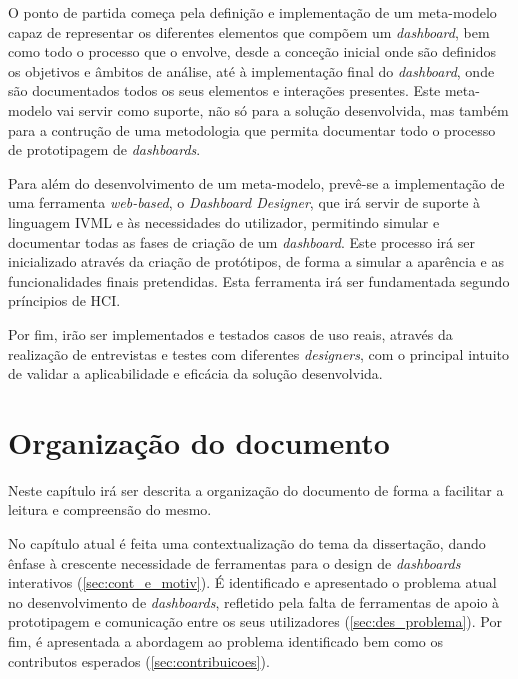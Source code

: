O ponto de partida começa pela definição e implementação de um meta-modelo capaz de representar os diferentes elementos que compõem um \textit{dashboard}, bem como todo o processo que o envolve, desde a conceção inicial onde são definidos os objetivos e âmbitos de análise, até à implementação final do \textit{dashboard}, onde são documentados todos os seus elementos e interações presentes. Este meta-modelo vai servir como suporte, não só para a solução desenvolvida, mas também para a contrução de uma metodologia que permita documentar todo o processo de prototipagem de \textit{dashboards}.

Para além do desenvolvimento de um meta-modelo, prevê-se a implementação de uma ferramenta \textit{web-based}, o \textit{Dashboard Designer}, que irá servir de suporte à linguagem \gls{IVML} e às necessidades do utilizador, permitindo simular e documentar todas as fases de criação de um \textit{dashboard}. Este processo irá ser inicializado através da criação de protótipos, de forma a simular a aparência e as funcionalidades finais pretendidas. Esta ferramenta irá ser fundamentada segundo príncipios de \gls{HCI}.

Por fim, irão ser implementados e testados casos de uso reais, através da realização de entrevistas e testes com diferentes \textit{designers}, com o principal intuito de validar a aplicabilidade e eficácia da solução desenvolvida. 

\section{Organização do documento}
\label{sec:organizacao}

Neste capítulo irá ser descrita a organização do documento de forma a facilitar a leitura e compreensão do mesmo. 

No capítulo atual é feita uma contextualização do tema da dissertação, dando ênfase à crescente necessidade de ferramentas para o design de \textit{dashboards} interativos (\ref{sec:cont_e_motiv}). É identificado e apresentado o problema atual no desenvolvimento de \textit{dashboards}, refletido pela falta de ferramentas de apoio à prototipagem e comunicação entre os seus utilizadores (\ref{sec:des_problema}). Por fim, é apresentada a abordagem ao problema identificado bem como os contributos esperados (\ref{sec:contribuicoes}).

